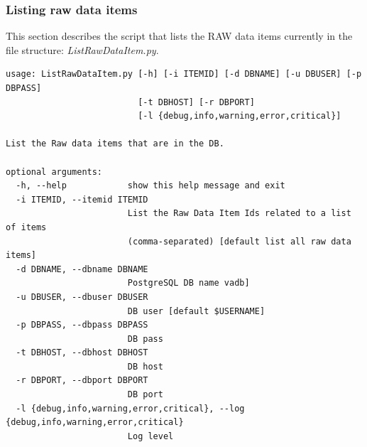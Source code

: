\subsubsection{Listing raw data items}
\label{sec:listraw}
This section describes the script that lists the RAW data items currently in the file structure: \textit{ListRawDataItem.py}.
\begin{Verbatim}[fontfamily=courier,commandchars=\\\{\},fontsize=\footnotesize]
usage: ListRawDataItem.py [-h] [-i ITEMID] [-d DBNAME] [-u DBUSER] [-p DBPASS]
                          [-t DBHOST] [-r DBPORT]
                          [-l {debug,info,warning,error,critical}]

List the Raw data items that are in the DB.

optional arguments:
  -h, --help            show this help message and exit
  -i ITEMID, --itemid ITEMID
                        List the Raw Data Item Ids related to a list of items
                        (comma-separated) [default list all raw data items]
  -d DBNAME, --dbname DBNAME
                        PostgreSQL DB name vadb]
  -u DBUSER, --dbuser DBUSER
                        DB user [default $USERNAME]
  -p DBPASS, --dbpass DBPASS
                        DB pass
  -t DBHOST, --dbhost DBHOST
                        DB host
  -r DBPORT, --dbport DBPORT
                        DB port
  -l {debug,info,warning,error,critical}, --log {debug,info,warning,error,critical}
                        Log level

\end{Verbatim}

